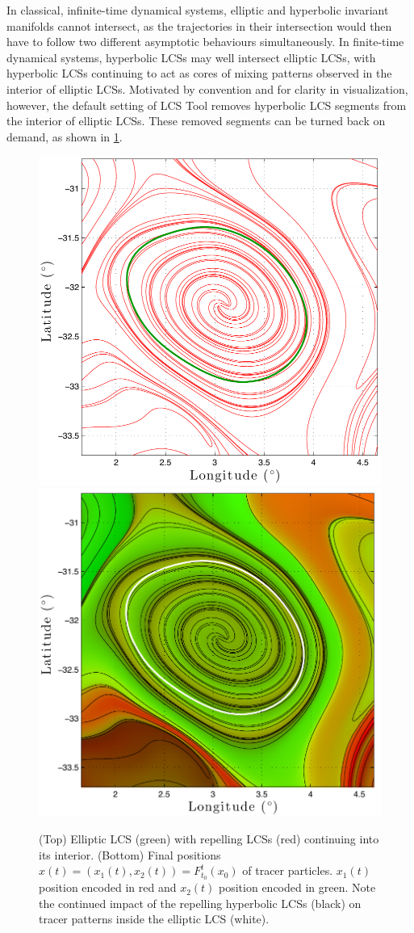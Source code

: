 \documentclass[5p]{elsarticle}
\begin{document}
In classical, infinite-time dynamical systems, elliptic and hyperbolic invariant manifolds cannot intersect, as the trajectories in their intersection would then have to follow two different asymptotic behaviours simultaneously. In finite-time dynamical systems, hyperbolic LCSs may well intersect elliptic LCSs, with hyperbolic LCSs continuing to act as cores of mixing patterns observed in the interior of elliptic LCSs. Motivated by convention and for clarity in visualization, however, the default setting of LCS Tool removes hyperbolic LCS segments from the interior of elliptic LCSs. These removed segments can be turned back on demand, as shown in \cref{f:ocean_dataset_colortracer}.

\begin{figure}
\centering
\includegraphics[width=.475\textwidth]{graphics/ocean_dataset/LCS_fwd_coherent_eddy}
\includegraphics[width=.475\textwidth]{graphics/ocean_dataset/LCS_fwd_colortracer}
\caption{(Top) Elliptic LCS (green) with repelling LCSs (red) continuing into its interior. (Bottom) Final positions $x(t) = (x_1(t),x_2(t)) = F_{t_0}^t(x_0)$ of tracer particles. $x_1(t)$ position encoded in red and $x_2(t)$ position encoded in green. Note the continued impact of the repelling hyperbolic LCSs (black) on tracer patterns inside the elliptic LCS (white).}
\label{f:ocean_dataset_colortracer}
\end{figure}
\end{document}
